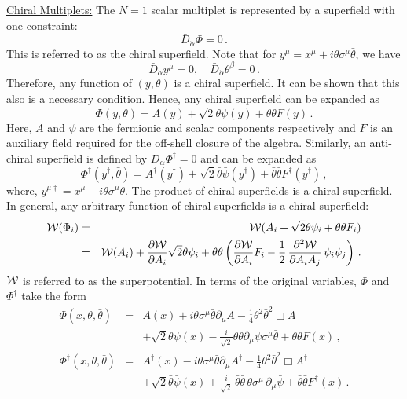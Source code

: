 \noindent\underline{Chiral Multiplets:} 
\noindent The $N=1$ scalar multiplet is represented by a superfield
with one constraint:
$$
\bar{D}_{\dot{\alpha}} \Phi = 0 \,.
$$
This is referred to as the chiral superfield. Note that for  
$y^\mu = x^\mu +i\theta\sigma^\mu\bar{\theta}$, we have 
$$
\bar{D}_{\dot\alpha}y^\mu=0,\quad\bar{D}_{\dot\alpha}\theta^\beta=0\,.
$$
Therefore, any function of $(y,\theta)$ is a chiral superfield. It can
be shown that this also is a necessary condition. Hence, any chiral
superfield can be expanded as  
\begin{equation}
\Phi(y,\theta)=A(y)+\sqrt{2}\theta\psi(y)+\theta\theta F(y)\,.
\label{csfy}
\end{equation}
Here, $A$ and $\psi$ are the fermionic and scalar components
respectively and $F$ is an auxiliary field required for the off-shell
closure of the algebra. Similarly, an anti-chiral superfield is
defined by $D_{\alpha}\Phi^\dagger=0$ and can be expanded as 
\begin{equation}
\Phi^\dagger(y^\dagger,\bar\theta) =A^\dagger(y^\dagger)+\sqrt{2}
\bar{\theta}\bar{\psi}(y^\dagger)+\bar{\theta}\bar{\theta} 
F^\dagger(y^\dagger)\,,
\label{acsfy}
\end{equation}
where, $y^{\mu\dagger}=x^\mu-i\theta\sigma^\mu\bar{\theta}$.
The product of chiral superfields is a chiral superfield. In general,
any arbitrary function of chiral superfields is a chiral superfield:
\begin{eqnarray}
{\cal W}(\Phi_{i}) &=& {\cal W}(A_{i} + \sqrt{2} \theta \psi_{i} +
\theta \theta F_{i} ) \nonumber \\
&=&{\cal W}(A_{i}) + \frac{\partial {\cal W}}{\partial A_{i}}
\sqrt{2} \theta \psi_{i} + \theta \theta \left (\frac{\partial 
{\cal W}}{\partial A_{i}} F_{i} - \frac{1}{2} \, \frac{\partial^{2}
{\cal W}}{\partial A_i A_j}\, \psi_{i} \psi_{j} \right)\,.
\label{spotential}
\end{eqnarray}
${\cal W}$ is referred to as the superpotential. In terms of the
original variables, $\Phi$ and $\Phi^\dagger$ take the form 
\begin{eqnarray}
\Phi(x,\theta,\bar\theta) &=& A(x)+i\theta\sigma^\mu \bar{\theta}
\partial_\mu A-\frac{1}{4}\theta^2 \bar{\theta}^2 \Box A 
\nonumber\\
&&+\sqrt{2}\theta\psi(x)-\frac{i}{\sqrt{2}}\theta\theta
\partial_\mu\psi\sigma^\mu\bar{\theta} +\theta \theta F(x)\,,
\label{csfield}
\\
\Phi^\dagger(x,\theta,\bar\theta)&=&A^\dagger(x)-i\theta\sigma^\mu
\bar{\theta} \partial_\mu A^\dagger - \frac{1}{4} \theta^{2}
\bar{\theta}^{2} \Box A^\dagger \nonumber\\
&&+\sqrt{2} \bar{\theta} \bar{\psi} (x) + \frac{i}{\sqrt{2}} \,
\bar{\theta} \bar{\theta} \, \theta \sigma^\mu \, \partial_\mu
\bar{\psi} + \bar{\theta} \bar{\theta} F^\dagger (x)\,.
\label{asfield}
\end{eqnarray}

